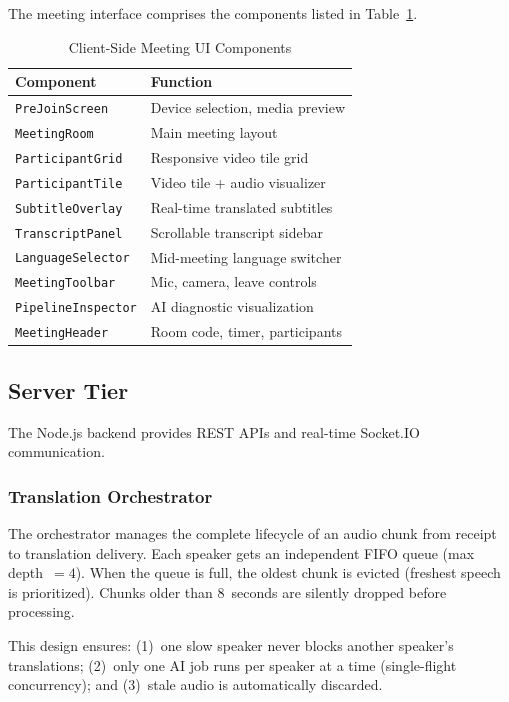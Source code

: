 \documentclass[conference]{IEEEtran}
\begin{document}
The meeting interface comprises the components listed in Table~\ref{tab:components}.

\begin{table}[htbp]
\centering
\caption{Client-Side Meeting UI Components}
\label{tab:components}
\begin{tabular}{ll}
\toprule
\textbf{Component} & \textbf{Function} \\
\midrule
\texttt{PreJoinScreen} & Device selection, media preview \\
\texttt{MeetingRoom} & Main meeting layout \\
\texttt{ParticipantGrid} & Responsive video tile grid \\
\texttt{ParticipantTile} & Video tile + audio visualizer \\
\texttt{SubtitleOverlay} & Real-time translated subtitles \\
\texttt{TranscriptPanel} & Scrollable transcript sidebar \\
\texttt{LanguageSelector} & Mid-meeting language switcher \\
\texttt{MeetingToolbar} & Mic, camera, leave controls \\
\texttt{PipelineInspector} & AI diagnostic visualization \\
\texttt{MeetingHeader} & Room code, timer, participants \\
\bottomrule
\end{tabular}
\end{table}

\subsection{Server Tier}

The Node.js backend provides REST APIs and real-time Socket.IO communication.

\subsubsection{Translation Orchestrator}

The orchestrator manages the complete lifecycle of an audio chunk from receipt to translation delivery. Each speaker gets an independent FIFO queue (max depth~$= 4$). When the queue is full, the oldest chunk is evicted (freshest speech is prioritized). Chunks older than 8~seconds are silently dropped before processing.

This design ensures: (1)~one slow speaker never blocks another speaker's translations; (2)~only one AI job runs per speaker at a time (single-flight concurrency); and (3)~stale audio is automatically discarded.
\end{document}
